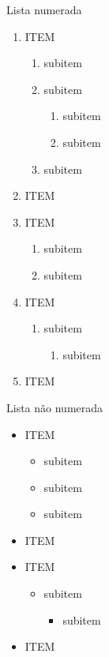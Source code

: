 \documentclass[a4paper, 12pt]{article}
\begin{document}
Lista numerada
\begin{enumerate}
  \item ITEM
  		\begin{enumerate}
  			\item subitem
  			\item subitem
  				\begin{enumerate}
  					\item subitem
  					\item subitem
  				\end{enumerate}
  			\item subitem
  		\end{enumerate}
  \item ITEM
  \item ITEM
  		\begin{enumerate}
  			\item subitem
  			\item subitem
  		\end{enumerate}
  \item ITEM
  		\begin{enumerate}
  			\item subitem
  				\begin{enumerate}
  					\item subitem
  				\end{enumerate}
  		\end{enumerate}
  \item ITEM
\end{enumerate}

Lista não numerada

\begin{itemize}
	\item ITEM
	\begin{itemize}
		\item subitem
		\item subitem
		\item subitem
	\end{itemize}
	\item ITEM
	\item ITEM
		\begin{itemize}
			\item subitem
				\begin{itemize}
					\item subitem
				\end{itemize}
		\end{itemize}
	\item ITEM
\end{itemize}
\end{document}

